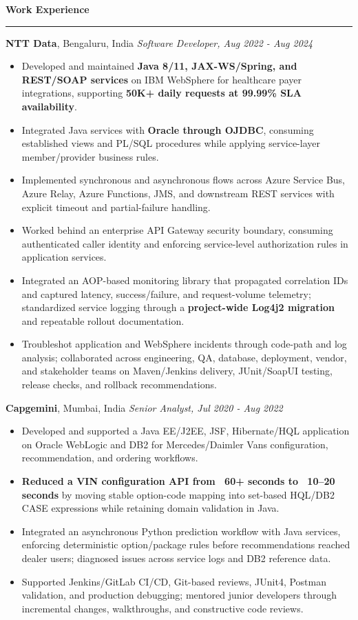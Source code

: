 \documentclass[11pt,letterpaper]{article}
\newcommand{\ressection}[1]{\Needspace{6\baselineskip}\vspace{8pt}\par\textbf{#1}\par\vspace{2pt}\hrule\vspace{5pt}}
\begin{document}
\ressection{Work Experience}
\textbf{NTT Data}, Bengaluru, India \hfill \textit{Software Developer, Aug 2022 - Aug 2024}
\begin{itemize}
  \item Developed and maintained \textbf{Java 8/11, JAX-WS/Spring, and REST/SOAP services} on IBM WebSphere for healthcare payer integrations, supporting \textbf{50K+ daily requests at 99.99\% SLA availability}.
  \item Integrated Java services with \textbf{Oracle through OJDBC}, consuming established views and PL/SQL procedures while applying service-layer member/provider business rules.
  \item Implemented synchronous and asynchronous flows across Azure Service Bus, Azure Relay, Azure Functions, JMS, and downstream REST services with explicit timeout and partial-failure handling.
  \item Worked behind an enterprise API Gateway security boundary, consuming authenticated caller identity and enforcing service-level authorization rules in application services.
  \item Integrated an AOP-based monitoring library that propagated correlation IDs and captured latency, success/failure, and request-volume telemetry; standardized service logging through a \textbf{project-wide Log4j2 migration} and repeatable rollout documentation.
  \item Troubleshot application and WebSphere incidents through code-path and log analysis; collaborated across engineering, QA, database, deployment, vendor, and stakeholder teams on Maven/Jenkins delivery, JUnit/SoapUI testing, release checks, and rollback recommendations.
\end{itemize}
\textbf{Capgemini}, Mumbai, India \hfill \textit{Senior Analyst, Jul 2020 - Aug 2022}
\begin{itemize}
  \item Developed and supported a Java EE/J2EE, JSF, Hibernate/HQL application on Oracle WebLogic and DB2 for Mercedes/Daimler Vans configuration, recommendation, and ordering workflows.
  \item \textbf{Reduced a VIN configuration API from ~60+ seconds to ~10--20 seconds} by moving stable option-code mapping into set-based HQL/DB2 CASE expressions while retaining domain validation in Java.
  \item Integrated an asynchronous Python prediction workflow with Java services, enforcing deterministic option/package rules before recommendations reached dealer users; diagnosed issues across service logs and DB2 reference data.
  \item Supported Jenkins/GitLab CI/CD, Git-based reviews, JUnit4, Postman validation, and production debugging; mentored junior developers through incremental changes, walkthroughs, and constructive code reviews.
\end{itemize}
\end{document}
